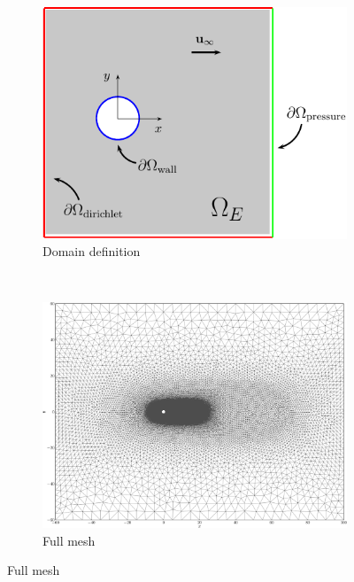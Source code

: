 	\begin{figure}[p]
     \centering
     \begin{subfigure}[t]{0.45\textwidth}
             \includegraphics[width=\textwidth]{figures/eulerian/ISCDomainDefinition-crop.pdf}
             \caption{Domain definition}
             \label{fig:ISCDomainDefinition-crop}
     \end{subfigure}%
     ~ %
     \begin{subfigure}[t]{0.45\textwidth}
             \includegraphics[width=\textwidth]{figures/eulerian/ISC_mesh-crop.pdf}
             \caption{Full mesh}
             \label{fig:ISC_mesh}
     \end{subfigure}


\end{figure}
